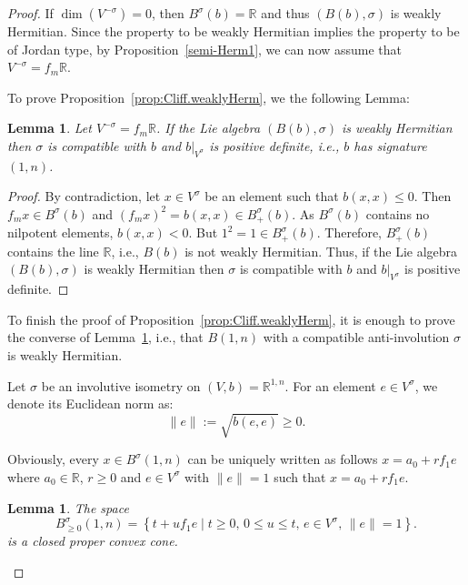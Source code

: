 \documentclass[a4paper,oneside,11pt]{amsart}
\newcommand{\R}{\mathbb R}
\theoremstyle{plain}
\newtheorem{lem}[teo]{Lemma}
\theoremstyle{definition}
\theoremstyle{remark}
\begin{document}
\begin{proof} If $\dim(V^{-\sigma})=0$, then $B^\sigma(b)=\R$ and thus $(B(b),\sigma)$ is weakly Hermitian. Since the property to be weakly Hermitian implies the property to be of Jordan type, by Proposition~\ref{semi-Herm1}, we can now assume that $V^{-\sigma}=f_m\R$.

To prove Proposition~\ref{prop:Cliff.weaklyHerm}, we the following Lemma:

\begin{lem}\label{lem:weak.Herm.Clifford}
    Let $V^{-\sigma}=f_m\R$. If the Lie algebra $(B(b),\sigma)$ is weakly Hermitian then $\sigma$ is compatible with $b$ and $b|_{V^{\sigma}}$ is positive definite, i.e.,  $b$ has signature $(1,n)$.
\end{lem}

\begin{proof}
    By contradiction, let $x\in V^{\sigma}$ be an element such that $b(x,x)\leq 0$. Then $f_mx\in B^\sigma(b)$ and $(f_mx)^2=b(x,x)\in B^\sigma_+(b)$. As $B^\sigma(b)$ contains no nilpotent elements, $b(x,x)< 0$. But $1^2=1\in B^\sigma_+(b)$. Therefore, $B^\sigma_+(b)$ contains the line $\R$, i.e., $B(b)$ is not weakly Hermitian. Thus, if the Lie algebra $(B(b),\sigma)$ is weakly Hermitian then $\sigma$ is compatible with $b$ and $b|_{V^{\sigma}}$ is positive definite.
\end{proof}

To finish the proof of Proposition~\ref{prop:Cliff.weaklyHerm}, it is enough to prove the converse of Lemma~\ref{lem:weak.Herm.Clifford}, i.e., that $B(1,n)$ with a compatible anti-involution $\sigma$ is weakly Hermitian. 


Let $\sigma$ be an involutive isometry on $(V,b)=\R^{1,n}$. For an element $e\in V^\sigma$, we denote its Euclidean norm as:
$$\|e\|:=\sqrt{b(e,e)}\geq 0.$$

Obviously, every $x\in B^{\sigma}(1,n)$ can be uniquely written as follows $x=a_0+rf_1e$ where $a_0\in\R$, $r\geq 0$ and $e\in V^\sigma$ with $\|e\|=1$ such that $x=a_0+rf_1e$.

\begin{lem}\label{lem:Clif_cone}
The space
$$B^{\sigma}_{\geq 0}(1,n)=\left\{t+uf_1e\mid t\geq 0,\,0\leq u\leq t,\,e\in V^\sigma,\, \|e\|=1\right\}.$$
is a closed proper convex cone.
\end{lem}


\end{proof}
\end{document}
